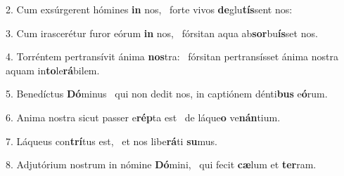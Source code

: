 2. Cum exsúrgerent hómines \textbf{in} nos, \ast\  forte vivos \textbf{de}glu\textbf{tís}sent nos:\

3. Cum irascerétur furor eórum \textbf{in} nos, \ast\  fórsitan aqua ab\textbf{sor}bu\textbf{ís}set nos.\

4. Torréntem pertransívit ánima \textbf{nos}tra: \ast\  fórsitan pertransísset ánima nostra aquam in\textbf{to}le\textbf{rá}bilem.\

5. Benedíctus \textbf{Dó}minus \ast\  qui non dedit nos, in captiónem dénti\textbf{bus} e\textbf{ó}rum.\

6. Anima nostra sicut passer e\textbf{rép}ta est \ast\  de láque\textbf{o} ve\textbf{nán}tium.\

7. Láqueus con\textbf{trí}tus est, \ast\  et nos libe\textbf{rá}ti \textbf{su}mus.\

8. Adjutórium nostrum in nómine \textbf{Dó}mini, \ast\  qui fecit \textbf{cæ}lum et \textbf{ter}ram.\

